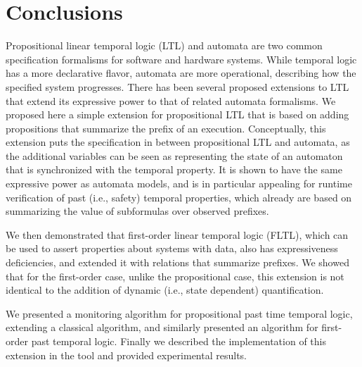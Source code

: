 
\section{Conclusions}

Propositional linear temporal logic (LTL) and automata are two common specification formalisms for software and hardware systems. While temporal logic has a more declarative
flavor, automata are more operational, describing how the specified system
progresses. There has been several proposed extensions to LTL that extend
its expressive power to that of related automata formalisms. We proposed here
a simple extension for propositional LTL that is based on adding propositions that summarize the prefix of an execution. Conceptually, this extension puts the specification in between propositional LTL and automata, as the additional
variables can be seen as representing the state of an automaton
that is synchronized with the temporal property. It is shown to have
the same expressive power as automata models, and is in particular
appealing for runtime verification of past (i.e., safety) temporal properties,
which already are based on summarizing the value of subformulas over
observed prefixes.

We then demonstrated that first-order linear temporal logic (FLTL), which
can be used to assert properties about systems with data, also has expressiveness deficiencies, and extended it with relations that summarize prefixes.
We showed that for the first-order case, unlike the propositional case,
this extension is not identical to the addition of dynamic (i.e., state dependent) quantification.

We presented a monitoring
algorithm for propositional past time temporal logic, extending a classical algorithm, and similarly presented an algorithm for 
first-order past temporal logic.
Finally we described the implementation of this extension in the \dejavu{} tool and provided experimental results.
